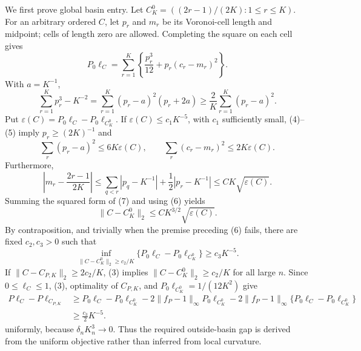 We first prove global basin entry.  Let \(C_K^0=((2r-1)/(2K):1\leq r\leq K)\).  For an arbitrary ordered \(C\), let \(p_r\) and \(m_r\) be its Voronoi-cell length and midpoint; cells of length zero are allowed.  Completing the square on each cell gives
\[
 P_0\ell_C=\sum_{r=1}^K\left\{\frac{p_r^3}{12}+p_r(c_r-m_r)^2\right\}.          \tag{4}
\]
With \(a=K^{-1}\),
\[
 \sum_{r=1}^Kp_r^3-K^{-2}
 =\sum_{r=1}^K(p_r-a)^2(p_r+2a)
 \geq\frac2K\sum_{r=1}^K(p_r-a)^2.                                           \tag{5}
\]
Put \(\varepsilon(C)=P_0\ell_C-P_0\ell_{C_K^0}\).  If \(\varepsilon(C)\leq c_1K^{-5}\), with \(c_1\) sufficiently small, (4)--(5) imply \(p_r\geq(2K)^{-1}\) and
\[
 \sum_r(p_r-a)^2\leq6K\varepsilon(C),\qquad
 \sum_r(c_r-m_r)^2\leq2K\varepsilon(C).                                      \tag{6}
\]
Furthermore,
\[
 \left|m_r-\frac{2r-1}{2K}\right|
 \leq\sum_{q<r}|p_q-K^{-1}|+\frac12|p_r-K^{-1}|
 \leq CK\sqrt{\varepsilon(C)}.                                                \tag{7}
\]
Summing the squared form of (7) and using (6) yields
\[
 \|C-C_K^0\|_2\leq CK^{3/2}\sqrt{\varepsilon(C)}.                             \tag{8}
\]
By contraposition, and trivially when the premise preceding (6) fails, there are fixed \(c_2,c_3>0\) such that
\[
 \inf_{\|C-C_K^0\|_2\geq c_2/K}
 \{P_0\ell_C-P_0\ell_{C_K^0}\}\geq c_3K^{-5}.                                \tag{9}
\]
If \(\|C-C_{P,K}\|_2\geq2c_2/K\), (3) implies \(\|C-C_K^0\|_2\geq c_2/K\) for all large \(n\).  Since \(0\leq\ell_C\leq1\), (3), optimality of \(C_{P,K}\), and \(P_0\ell_{C_K^0}=1/(12K^2)\) give
\[
\begin{aligned}
 P\ell_C-P\ell_{C_{P,K}}
 &\geq P_0\ell_C-P_0\ell_{C_K^0}
      -2\|f_P-1\|_\infty P_0\ell_{C_K^0}
      -2\|f_P-1\|_\infty\{P_0\ell_C-P_0\ell_{C_K^0}\}\\
 &\geq \frac{c_3}{2}K^{-5}.
\end{aligned}                                                                  \tag{10}
\]
uniformly, because \(\delta_nK_n^3\to0\).  Thus the required outside-basin gap is derived from the uniform objective rather than inferred from local curvature.

